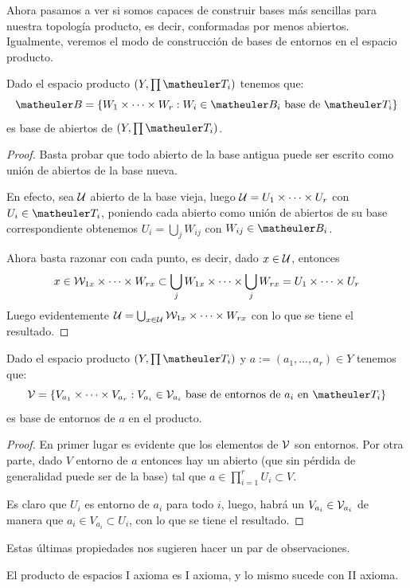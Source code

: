 Ahora pasamos a ver si somos capaces de construir bases más sencillas para nuestra topología producto, es decir, conformadas por menos abiertos. Igualmente, veremos el modo de construcción de bases de entornos en el espacio producto. \begin{prop}
	\label{const_prop_base}
	Dado el espacio producto $(Y,\prod\T_i)$ tenemos que: \[\B=\{W_1\times\cdots\times W_r:W_i\in \B_i \text{ base de }\T_i\}\] es base de abiertos de $(Y,\prod\T_i)$.
\end{prop}
	\begin{proof}
		Basta probar que todo abierto de la base antigua puede ser escrito como unión de abiertos de la base nueva.
		
		En efecto, sea $\mathcal{U}$ abierto de la base vieja, luego $\mathcal{U} =U_1 \times \dots \times U_r $ con $U_i \in \T_i$, poniendo cada abierto como unión de abiertos de su base correspondiente obtenemos $U_i = \bigcup_j W_{ij}$ con $W_{ij} \in \B_i$.
		
		Ahora basta razonar con cada punto, es decir, dado $x \in \mathcal{U}$, entonces \[x \in \mathcal{W}_{1x} \times \dots \times W_{rx} \subset \bigcup_j W_{1x} \times \dots \times \bigcup_j W_{rx} = U_1 \times \dots \times U_r\]	
		Luego evidentemente $\mathcal{U}=\bigcup_{x\in\mathcal{U}}\mathcal{W}_{1x} \times \dots \times W_{rx}$ con lo que se tiene el resultado.
	\end{proof}
\begin{prop}
	\label{const_prop_base2}
	Dado el espacio producto $(Y,\prod\T_i)$ y $a:=(a_1,\dots,a_r)\in Y$ tenemos que: \[\V=\{V_{a_1}\times\cdots\times V_{a_r}:V_{a_i}\in \V_{a_i} \text{ base de entornos de $a_i$ en } \T_i\} \] es base de entornos de $a$ en el producto.
\end{prop}
\begin{proof}
	En primer lugar es evidente que los elementos de $\mathcal{V}$ son entornos. Por otra parte, dado $V$ entorno de $a$ entonces hay un abierto (que sin pérdida de generalidad puede ser de la base) tal que $a\in\prod_{i=1}^rU_i\subset V$.
	
	Es claro que $U_i$ es entorno de $a_i$ para todo $i$, luego, habrá un $V_{a_i}\in\mathcal{V}_{a_i}$ de manera que $a_i\in V_{a_i}\subset U_i$, con lo que se tiene el resultado.
\end{proof}
Estas últimas propiedades nos sugieren hacer un par de observaciones.
\begin{obs}
	El producto de espacios I axioma es I axioma, y lo mismo sucede con II axioma.
\end{obs}

